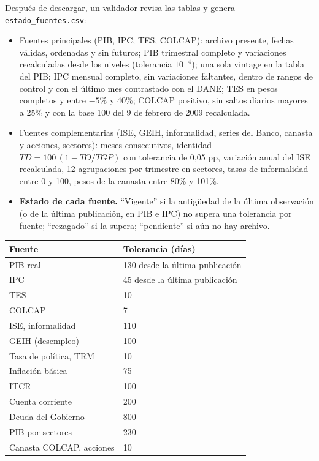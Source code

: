 Después de descargar, un validador revisa las tablas y genera
\texttt{estado\_fuentes.csv}:

\begin{itemize}
\tightlist
\item
  Fuentes principales (PIB, IPC, TES, COLCAP): archivo presente, fechas
  válidas, ordenadas y sin futuros; PIB trimestral completo y
  variaciones recalculadas desde los niveles (tolerancia \(10^{-4}\));
  una sola vintage en la tabla del PIB; IPC mensual completo, sin
  variaciones faltantes, dentro de rangos de control y con el último mes
  contrastado con el DANE; TES en pesos completos y entre \(-5\%\) y
  40\%; COLCAP positivo, sin saltos diarios mayores a 25\% y con la base
  100 del 9 de febrero de 2009 recalculada.
\item
  Fuentes complementarias (ISE, GEIH, informalidad, series del Banco,
  canasta y acciones, sectores): meses consecutivos, identidad
  \(TD=100\,(1-TO/TGP)\) con tolerancia de 0,05 pp, variación anual del
  ISE recalculada, 12 agrupaciones por trimestre en sectores, tasas de
  informalidad entre 0 y 100, pesos de la canasta entre 80\% y 101\%.
\item
  \textbf{Estado de cada fuente.} ``Vigente'' si la antigüedad de la
  última observación (o de la última publicación, en PIB e IPC) no
  supera una tolerancia por fuente; ``rezagado'' si la supera;
  ``pendiente'' si aún no hay archivo.
\end{itemize}

\small\begin{longtable}[]{@{}ll@{}}
\toprule\noalign{}
Fuente & Tolerancia (días) \\
\midrule\noalign{}
\endhead
\bottomrule\noalign{}
\endlastfoot
PIB real & 130 desde la última publicación \\
IPC & 45 desde la última publicación \\
TES & 10 \\
COLCAP & 7 \\
ISE, informalidad & 110 \\
GEIH (desempleo) & 100 \\
Tasa de política, TRM & 10 \\
Inflación básica & 75 \\
ITCR & 100 \\
Cuenta corriente & 200 \\
Deuda del Gobierno & 800 \\
PIB por sectores & 230 \\
Canasta COLCAP, acciones & 10 \\
\end{longtable}\normalsize

